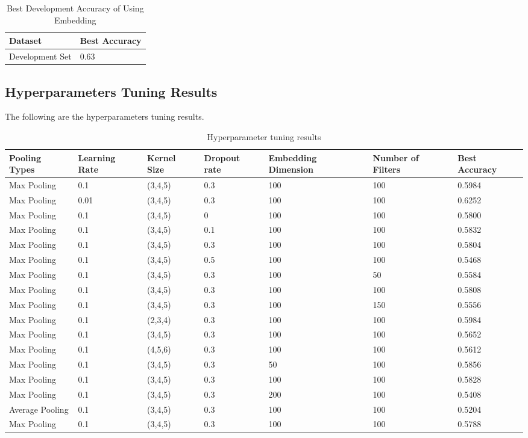 \documentclass{article}
\begin{document}
\begin{table}[htb]
	\caption{Best Development Accuracy of Using Embedding}
	\label{sample-table}
	\centering
	\begin{tabular}{ll}
		\toprule
		\cmidrule{1-2}
		Dataset & Best Accuracy\\
		\midrule
		Development Set & 0.63   \\
		\bottomrule
	\end{tabular}
\end{table}

\subsection{Hyperparameters Tuning Results}
The following are the hyperparameters tuning results.

\begin{table}[htb]
	\caption{Hyperparameter tuning results}
	\label{sample-table}
	\centering
	\begin{tabular}{lllllll}
		\toprule
		\cmidrule{1-7}
		Pooling Types & Learning Rate & Kernel Size & Dropout rate & Embedding Dimension 	& Number of Filters & Best Accuracy\\
		\midrule
		Max Pooling & 0.1  & (3,4,5) & 0.3 & 100 & 100 & 0.5984 \\
		Max Pooling & 0.01  & (3,4,5) & 0.3 & 100 & 100 & 0.6252 \\
		
		Max Pooling & 0.1  & (3,4,5) & 0 & 100 & 100 & 0.5800 \\
		Max Pooling & 0.1  & (3,4,5) & 0.1 & 100 & 100 & 0.5832 \\
		Max Pooling & 0.1  & (3,4,5) & 0.3 & 100 & 100 & 0.5804 \\
		Max Pooling & 0.1  & (3,4,5) & 0.5 & 100 & 100 & 0.5468 \\
		
		Max Pooling & 0.1  & (3,4,5) & 0.3 & 100 & 50 & 0.5584 \\
		Max Pooling & 0.1  & (3,4,5) & 0.3 & 100 & 100 & 0.5808 \\
		Max Pooling & 0.1  & (3,4,5) & 0.3 & 100 & 150 & 0.5556 \\
		
		Max Pooling & 0.1  & (2,3,4) & 0.3 & 100 & 100 & 0.5984 \\
		Max Pooling & 0.1  & (3,4,5) & 0.3 & 100 & 100 & 0.5652 \\
		Max Pooling & 0.1  & (4,5,6) & 0.3 & 100 & 100 & 0.5612 \\
				
		Max Pooling & 0.1  & (3,4,5) & 0.3 & 50 & 100 & 0.5856 \\
		Max Pooling & 0.1  & (3,4,5) & 0.3 & 100 & 100 & 0.5828 \\
		Max Pooling & 0.1  & (3,4,5) & 0.3 & 200 & 100 & 0.5408 \\
		
		Average Pooling & 0.1  & (3,4,5) & 0.3 & 100 & 100 & 0.5204 \\
		Max Pooling & 0.1  & (3,4,5) & 0.3 & 100 & 100 & 0.5788  \\
		\bottomrule
	\end{tabular}
\end{table}
\end{document}
